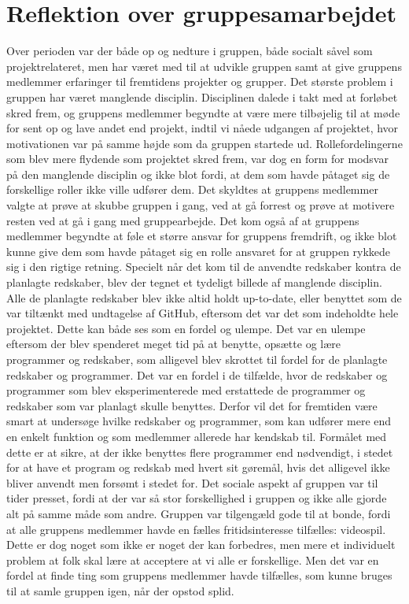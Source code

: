 \section{Reflektion over gruppesamarbejdet}\label{Reflektion-over-gruppesamarbejdet}
Over perioden var der både op og nedture i gruppen, både socialt såvel som projektrelateret, men har været med til at udvikle gruppen samt at give gruppens medlemmer erfaringer til fremtidens projekter og grupper. Det største problem i gruppen har været manglende disciplin. Disciplinen dalede i takt med at forløbet skred frem, og gruppens medlemmer begyndte at være mere tilbøjelig til at møde for sent op og lave andet end projekt, indtil vi nåede udgangen af projektet, hvor motivationen var på samme højde som da gruppen startede ud. Rollefordelingerne som blev mere flydende som projektet skred frem, var dog en form for modsvar på den manglende disciplin og ikke blot fordi, at dem som havde påtaget sig de forskellige roller ikke ville udfører dem. Det skyldtes at gruppens medlemmer valgte at prøve at skubbe gruppen i gang, ved at gå forrest og prøve at motivere resten ved at gå i gang med gruppearbejde. Det kom også af at gruppens medlemmer begyndte at føle et større ansvar for gruppens fremdrift, og ikke blot kunne give dem som havde påtaget sig en rolle ansvaret for at gruppen rykkede sig i den rigtige retning.
	Specielt når det kom til de anvendte redskaber kontra de planlagte redskaber, blev der tegnet et tydeligt billede af manglende disciplin. Alle de planlagte redskaber blev ikke altid holdt up-to-date, eller benyttet som de var tiltænkt med undtagelse af GitHub, eftersom det var det som indeholdte hele projektet. Dette kan både ses som en fordel og ulempe. Det var en ulempe eftersom der blev spenderet meget tid på at benytte, opsætte og lære programmer og redskaber, som alligevel blev skrottet til fordel for de planlagte redskaber og programmer. Det var en fordel i de tilfælde, hvor de redskaber og programmer som blev eksperimenterede med erstattede de programmer og redskaber som var planlagt skulle benyttes. Derfor vil det for fremtiden være smart at undersøge hvilke redskaber og programmer, som kan udfører mere end en enkelt funktion og som medlemmer allerede har kendskab til. Formålet med dette er at sikre, at der ikke benyttes flere programmer end nødvendigt, i stedet for at have et program og redskab med hvert sit gøremål, hvis det alligevel ikke bliver anvendt men forsømt i stedet for. 
	Det sociale aspekt af gruppen var til tider presset, fordi at der var så stor forskellighed i gruppen og ikke alle gjorde alt på samme måde som andre. Gruppen var tilgengæld gode til at bonde, fordi at alle gruppens medlemmer havde en fælles fritidsinteresse tilfælles: videospil. Dette er dog noget som ikke er noget der kan forbedres, men mere et individuelt problem at folk skal lære at acceptere at vi alle er forskellige. Men det var en fordel at finde ting som gruppens medlemmer havde tilfælles, som kunne bruges til at samle gruppen igen, når der opstod splid.